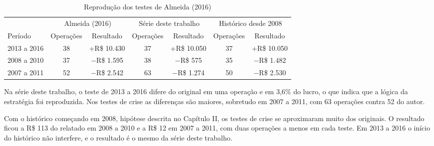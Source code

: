 \begin{table}[htbp]
\centering
\caption{Reprodução dos testes de Almeida (2016)}
\label{tab:replica}
\fontsize{10}{12}\selectfont
\begin{tabular}{l|c|c|c|c|c|c}
\hline
& \multicolumn{2}{c|}{Almeida (2016)} & \multicolumn{2}{c|}{Série deste trabalho} & \multicolumn{2}{c}{Histórico desde 2008} \\
\cline{2-7}
Período & Operações & Resultado & Operações & Resultado & Operações & Resultado \\
\hline
2013 a 2016 & 38 & +R\$ 10.430 & 37 & +R\$ 10.050 & 37 & +R\$ 10.050 \\
\hline
2008 a 2010 & 37 & $-$R\$ 1.595 & 38 & $-$R\$ 575 & 35 & $-$R\$ 1.482 \\
\hline
2007 a 2011 & 52 & $-$R\$ 2.542 & 63 & $-$R\$ 1.274 & 50 & $-$R\$ 2.530 \\
\hline
\end{tabular}
\end{table}

Na série deste trabalho, o teste de 2013 a 2016 difere do original em uma
operação e em 3,6\% do lucro, o que indica que a lógica da estratégia foi
reproduzida. Nos testes de crise as diferenças são maiores, sobretudo em 2007 a
2011, com 63 operações contra 52 do autor.

Com o histórico começando em 2008, hipótese descrita no Capítulo II, os testes de
crise se aproximaram muito dos originais. O resultado ficou a R\$ 113 do relatado
em 2008 a 2010 e a R\$ 12 em 2007 a 2011, com duas operações a menos em cada
teste. Em 2013 a 2016 o início do histórico não interfere, e o resultado é o mesmo
da série deste trabalho.

